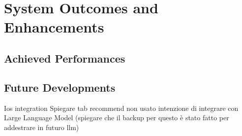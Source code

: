 \section{System Outcomes and Enhancements}

\subsection{Achieved Performances}

\subsection{Future Developments}
Ios integration
Spiegare tab recommend non usato intenzione di integrare con Large Language Model (spiegare che il backup per questo è stato fatto per addestrare in futuro llm)